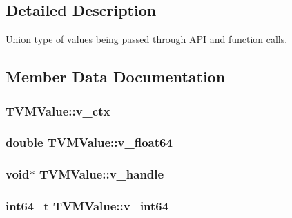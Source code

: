 \subsection{Detailed Description}
Union type of values being passed through A\+PI and function calls. 

\subsection{Member Data Documentation}
\subsubsection[{\texorpdfstring{v\+\_\+ctx}{v_ctx}}]{ T\+V\+M\+Value\+::v\+\_\+ctx}\hypertarget{unionTVMValue_a93e4b1809f77d08e5fb68384cd4c9088}{}\label{unionTVMValue_a93e4b1809f77d08e5fb68384cd4c9088}
\subsubsection[{\texorpdfstring{v\+\_\+float64}{v_float64}}]{\setlength{\rightskip}{0pt plus 5cm}double T\+V\+M\+Value\+::v\+\_\+float64}\hypertarget{unionTVMValue_abefae93ebafe8818c0060df2bf31e6e5}{}\label{unionTVMValue_abefae93ebafe8818c0060df2bf31e6e5}
\subsubsection[{\texorpdfstring{v\+\_\+handle}{v_handle}}]{\setlength{\rightskip}{0pt plus 5cm}void$\ast$ T\+V\+M\+Value\+::v\+\_\+handle}\hypertarget{unionTVMValue_a3b172297f9f7bf2f5391f7d87309cd44}{}\label{unionTVMValue_a3b172297f9f7bf2f5391f7d87309cd44}
\subsubsection[{\texorpdfstring{v\+\_\+int64}{v_int64}}]{\setlength{\rightskip}{0pt plus 5cm}int64\+\_\+t T\+V\+M\+Value\+::v\+\_\+int64}\hypertarget{unionTVMValue_aa1c40fa9e74fbf97541fd9735062c4cc}{}\label{unionTVMValue_aa1c40fa9e74fbf97541fd9735062c4cc}
